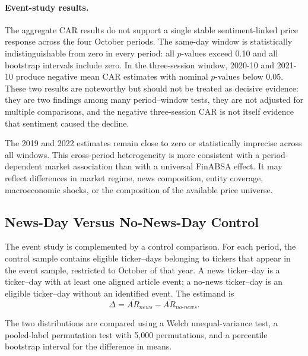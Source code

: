 \paragraph{Event-study results.}
The aggregate CAR results do not support a single stable sentiment-linked price response across the four October periods. The same-day window is statistically indistinguishable from zero in every period: all $p$-values exceed 0.10 and all bootstrap intervals include zero. In the three-session window, 2020-10 and 2021-10 produce negative mean CAR estimates with nominal $p$-values below 0.05. These two results are noteworthy but should not be treated as decisive evidence: they are two findings among many period--window tests, they are not adjusted for multiple comparisons, and the negative three-session CAR is not itself evidence that sentiment caused the decline.

The 2019 and 2022 estimates remain close to zero or statistically imprecise across all windows. This cross-period heterogeneity is more consistent with a period-dependent market association than with a universal FinABSA effect. It may reflect differences in market regime, news composition, entity coverage, macroeconomic shocks, or the composition of the available price universe.

\subsection{News-Day Versus No-News-Day Control}
\label{subsec:news-control-multi-year}

The event study is complemented by a control comparison. For each period, the control sample contains eligible ticker--days belonging to tickers that appear in the event sample, restricted to October of that year. A news ticker--day is a ticker--day with at least one aligned article event; a no-news ticker--day is an eligible ticker--day without an identified event. The estimand is
\begin{equation}
 \Delta=\overline{AR}_{news}-\overline{AR}_{no\text{-}news}.
\end{equation}

The two distributions are compared using a Welch unequal-variance test, a pooled-label permutation test with 5,000 permutations, and a percentile bootstrap interval for the difference in means.

